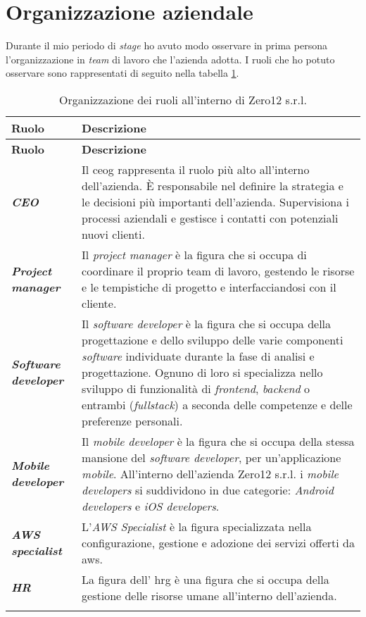\section{Organizzazione aziendale}
Durante il mio periodo di \textit{stage} ho avuto modo osservare in prima persona l'organizzazione in \textit{team} di lavoro che l'azienda adotta.
I ruoli che ho potuto osservare sono rappresentati di seguito nella tabella \ref{tab:ruoli}.
\begin{longtable}{|>{\RaggedRight\arraybackslash}p{3.5cm}|>{\RaggedRight\arraybackslash}p{8.5cm}|}
    \hline
    \rowcolor{tableheader}\textbf{Ruolo} & \textbf{Descrizione} \\
    \hline
    \endfirsthead

    \rowcolor{tableheader}\textbf{Ruolo} & \textbf{Descrizione} \\
    \hline
    \endhead

    \hline
    \endfoot

    \hline
    \endlastfoot
    \hline
    \rowcolor{tableoddrow}\textbf{\textit{CEO}} & Il \gls{ceog} rappresenta il ruolo più alto all'interno dell'azienda. È responsabile nel definire la strategia e le decisioni più importanti dell'azienda. Supervisiona i processi aziendali e gestisce i contatti con potenziali nuovi clienti. \\
    \hline
    \rowcolor{tableevenrow}\textbf{\textit{Project manager}} & Il \textit{project manager} è la figura che si occupa di coordinare il proprio team di lavoro, gestendo le risorse e le tempistiche di progetto e interfacciandosi con il cliente.\\
    \hline
    \rowcolor{tableoddrow}\textbf{\textit{Software developer}} & Il \textit{software developer} è la figura che si occupa della progettazione e dello sviluppo delle varie componenti \textit{software} individuate durante la fase di analisi e progettazione. Ognuno di loro si specializza nello sviluppo di funzionalità di \textit{frontend}, \textit{backend} o entrambi (\textit{fullstack}) a seconda delle competenze e delle preferenze personali.\\
    \hline
    \rowcolor{tableevenrow}\textbf{\textit{Mobile developer}} & Il \textit{mobile developer} è la figura che si occupa della stessa mansione del \textit{software developer}, per un'applicazione \textit{mobile}. All'interno dell'azienda Zero12 s.r.l. i \textit{mobile developers} si suddividono in due categorie: \textit{Android developers} e \textit{iOS developers}.\\
    \hline
    \rowcolor{tableoddrow}\textbf{\textit{AWS specialist}} & L'\textit{AWS Specialist} è la figura specializzata nella configurazione, gestione e adozione dei servizi offerti da \gls{aws}.\\
    \hline
    \rowcolor{tableevenrow}\textbf{\textit{HR}} & La figura dell' \gls{hrg} è una figura che si occupa della gestione delle risorse umane all'interno dell'azienda.\\
    \hline
    \caption{Organizzazione dei ruoli all'interno di Zero12 s.r.l.}
    \label{tab:ruoli}
\end{longtable}

